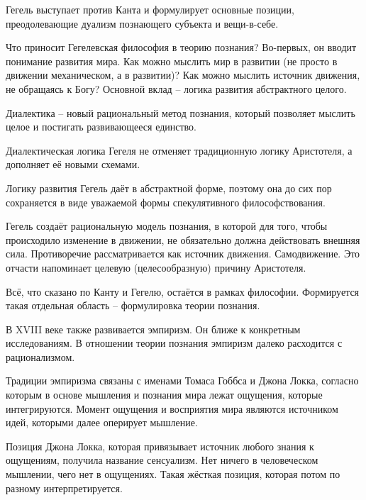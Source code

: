 \documentclass[main.tex]{subfiles}
\begin{document}
Гегель выступает против Канта и формулирует основные позиции, преодолевающие дуализм познающего субъекта и вещи-в-себе.



Что приносит Гегелевская философия в теорию познания?
Во-первых, он вводит понимание развития мира.
Как можно мыслить мир в развитии (не просто в движении механическом, а в развитии)?
Как можно мыслить источник движения, не обращаясь к Богу?
Основной вклад -- логика развития абстрактного целого.

Диалектика -- новый рациональный метод познания, который позволяет мыслить целое и постигать развивающееся единство.

Диалектическая логика Гегеля не отменяет традиционную логику Аристотеля, а дополняет её новыми схемами.



Логику развития Гегель даёт в абстрактной форме, поэтому она до сих пор сохраняется в виде уважаемой формы спекулятивного философствования.

Гегель создаёт рациональную модель познания, в которой для того, чтобы происходило изменение в движении, не обязательно должна действовать внешняя сила.
Противоречие рассматривается как источник движения.
Самодвижение.
Это отчасти напоминает целевую (целесообразную) причину Аристотеля.

Всё, что сказано по Канту и Гегелю, остаётся в рамках философии.
Формируется такая отдельная область -- формулировка теории познания. 



В XVIII веке также развивается эмпиризм.
Он ближе к конкретным исследованиям.
В отношении теории познания эмпиризм далеко расходится с рационализмом.

Традиции эмпиризма связаны с именами Томаса Гоббса и Джона Локка, согласно которым в основе мышления и познания мира лежат ощущения, которые интегрируются.
Момент ощущения и восприятия мира являются источником идей, которыми далее оперирует мышление.

Позиция Джона Локка, которая привязывает источник любого знания к ощущениям, получила название сенсуализм.
Нет ничего в человеческом мышлении, чего нет в ощущениях.
Такая жёсткая позиция, которая потом по разному интерпретируется.
\end{document}
